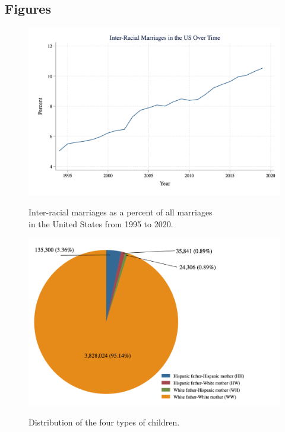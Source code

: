 \documentclass{wptemp}
\begin{document}
\pagebreak

\newpage
\pagebreak
\begin{appendices}

\section{Figures}\label{appendix:figures}


\begin{center}
\begin{figure}
\caption{Inter-racial marriages as a percent of all marriages \\
 in the United States from 1995 to 2020.}
\includegraphics[width=\textwidth]{interracialovertime.png} 
\label{fig:3}
\end{figure}
\end{center}

\newpage

\begin{center}
\begin{figure}
\caption{Distribution of the four types of children.}
\includegraphics[width=\textwidth]{PirChart2.png} 
\label{fig:dist}
\end{figure}
\end{center}


\end{appendices}
\end{document}
